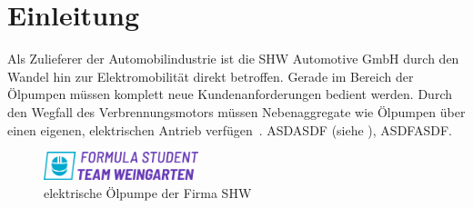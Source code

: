 \section{Einleitung}


Als Zulieferer der Automobilindustrie ist die SHW Automotive GmbH durch den Wandel hin zur Elektromobilität direkt betroffen. Gerade im Bereich der Ölpumpen müssen komplett neue Kundenanforderungen bedient werden. Durch den Wegfall des Verbrennungsmotors müssen Nebenaggregate wie Ölpumpen über einen eigenen, elektrischen Antrieb verfügen~\cite{kampkerElektromobilitaetGrundlagenFortschrittstechnologie2024}. 
ASDASDF (siehe ), ASDFASDF.

\vspace{0.5cm}
\begin{figure}[h]
    \centering
    \includegraphics[width=0.4\textwidth]{media/pic.png}
    \caption{elektrische Ölpumpe der Firma SHW~\cite{SHW_pumpe}}
    \label{fig:e-pumpe}
\end{figure}
\vspace{0.2cm}

\blindtext{}

\newpage